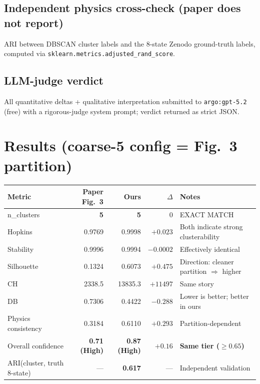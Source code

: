 \documentclass[11pt]{article}
\begin{document}
\subsection{Independent physics cross-check (paper does not report)}
ARI between DBSCAN cluster labels and the 8-state Zenodo ground-truth labels, computed via \texttt{sklearn.metrics.adjusted\_rand\_score}.

\subsection{LLM-judge verdict}
All quantitative deltas + qualitative interpretation submitted to \texttt{argo:gpt-5.2} (free) with a rigorous-judge system prompt; verdict returned as strict JSON.

\section{Results (coarse-5 config = Fig.~3 partition)}

\begin{table}[h!]
\centering\small
\begin{tabular}{lrrrl}
\toprule
Metric & Paper Fig.~3 & Ours & $\Delta$ & Notes \\
\midrule
n\_clusters & \textbf{5} & \textbf{5} & 0 & EXACT MATCH \\
Hopkins & 0.9769 & 0.9998 & $+0.023$ & Both indicate strong clusterability \\
Stability & 0.9996 & 0.9994 & $-0.0002$ & Effectively identical \\
Silhouette & 0.1324 & 0.6073 & $+0.475$ & Direction: cleaner partition $\Rightarrow$ higher \\
CH & 2338.5 & 13835.3 & $+11497$ & Same story \\
DB & 0.7306 & 0.4422 & $-0.288$ & Lower is better; better in ours \\
Physics consistency & 0.3184 & 0.6110 & $+0.293$ & Partition-dependent \\
Overall confidence & \textbf{0.71 (High)} & \textbf{0.87 (High)} & $+0.16$ & \textbf{Same tier ($\geq 0.65$)} \\
\midrule
ARI(cluster, truth 8-state) & --- & \textbf{0.617} & --- & Independent validation \\
\bottomrule
\end{tabular}
\end{table}
\end{document}
